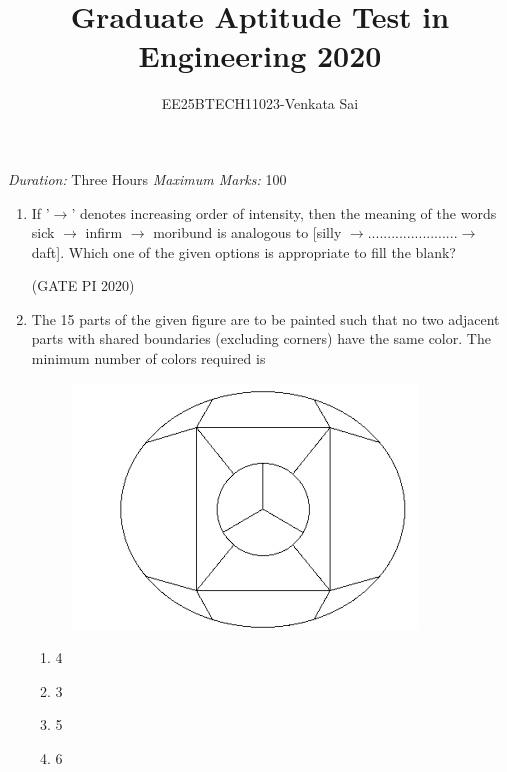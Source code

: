 \documentclass[journal,12pt,onecolumn]{IEEEtran}
\title{Graduate Aptitude Test in Engineering 2020}
\author{EE25BTECH11023-Venkata Sai}
\theoremstyle{remark}
\begin{document}
\noindent
\maketitle
\textit{Duration:} Three Hours \hfill \textit{Maximum Marks:} 100

\begin{enumerate}
\item If '$\rightarrow$' denotes increasing order of intensity, then the meaning of the words {sick $\rightarrow$ infirm $\rightarrow$ moribund} is analogous to [silly $\rightarrow ....................... \rightarrow$ daft]. Which one of the given options is appropriate to fill the blank?
\begin{enumerate}
\end{enumerate}

\hfill (GATE PI 2020)

\item The 15 parts of the given figure are to be painted such that no two adjacent parts with shared boundaries (excluding corners) have the same color. The minimum number of colors required is

\begin{figure}[h]
    \centering
    \includegraphics[width=0.5\columnwidth]{figs/fig1.png}
    \caption{}
    \label{fig:placeholder}
\end{figure} 
\begin{multicols}{4}
\begin{enumerate}
    \item 4
    \item 3
    \item 5
    \item 6
\end{enumerate}
\end{multicols}


\end{enumerate}
\end{document}
